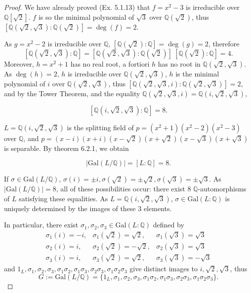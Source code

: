 \documentclass[11pt,a4paper]{article}
\newcommand{\Q}{\mathbb{Q}}
\newcommand{\Gal}{\mathrm{Gal}}
\begin{document}
\begin{proof}
We have already proved (Ex. 5.1.13) that $f= x^2-3$ is irreducible over $\Q[\sqrt{2}]$. $f$ is so the minimal polynomial of $\sqrt{3}$ over $\Q(\sqrt{2})$, thus $[\Q(\sqrt{2},\sqrt{3}):\Q(\sqrt{2})]=\deg(f) = 2$.

As $g = x^2 - 2$ is irreducible over $\Q$, $[\Q(\sqrt{2}):\Q] =\deg(g) =  2$, therefore
$$[\Q(\sqrt{2},\sqrt{3}):\Q] =  [\Q(\sqrt{2},\sqrt{3}):\Q(\sqrt{2})]\ [\Q(\sqrt{2}):\Q] = 4.$$
Moreover, $h = x^2+1$ has no real root, a fortiori $h$ has no root in  $\Q(\sqrt{2},\sqrt{3})$. As $\deg(h)=2$, $h$ is irreducible over $\Q(\sqrt{2},\sqrt{3})$, $h$ is the minimal polynomial of  $i$ over $\Q(\sqrt{2},\sqrt{3})$, thus $[\Q(\sqrt{2},\sqrt{3},i): \Q(\sqrt{2},\sqrt{3})]=2$, and by the Tower Theorem, and the equality $\Q(\sqrt{2},\sqrt{3},i) = \Q(i,\sqrt{2},\sqrt{3})$,

$$[\Q(i,\sqrt{2},\sqrt{3}):\Q] = 8.$$

$L = \Q(i,\sqrt{2},\sqrt{3})$ is the splitting field of $p = (x^2+1)(x^2-2)(x^2-3)$ over $\Q$, and $p =(x-i)(x+i)(x-\sqrt{2})(x+\sqrt{2})(x-\sqrt{3})(x+\sqrt{3})$ is separable. By theorem 6.2.1, we obtain

$$\vert \Gal(L / \Q) \vert = [L:\Q] = 8.$$

If $\sigma \in \Gal(L /\Q)$, $\sigma(i) = \pm i, \sigma(\sqrt{2}) = \pm \sqrt{2}, \sigma(\sqrt{3}) = \pm \sqrt{3}$. As $\vert \Gal(L / \Q) \vert = 8$, all of these  possibilities occur: there exist 8 $\Q$-automorphisms of $L$ satisfying these equalities. As $L = \Q(i,\sqrt{2},\sqrt{3})$, $\sigma \in \Gal(L : \Q)$ is uniquely determined by the images of these 3 elements.

In particular, there exist  $\sigma_1,\sigma_2,\sigma_3 \in \Gal(L : \Q)$ defined by
$$
\begin{array}{lll}
\sigma_1(i) = -i,& \sigma_1(\sqrt{2}) = \sqrt{2},& \sigma_1(\sqrt{3}) = \sqrt{3}\\
\sigma_2(i) = i, &\sigma_2(\sqrt{2}) =- \sqrt{2},& \sigma_2(\sqrt{3}) = \sqrt{3}\\
\sigma_3(i) = i,& \sigma_3(\sqrt{2}) = \sqrt{2}, &\sigma_3(\sqrt{3}) =- \sqrt{3}
\end{array}
$$
and $1_{L}, \sigma_1,\sigma_2,\sigma_3,\sigma_1\sigma_2, \sigma_1\sigma_3,\sigma_2\sigma_3,\sigma_1\sigma_2\sigma_3$ give distinct images to $i,\sqrt{2},\sqrt{3}$, thus
$$G := \Gal(L/\Q) = \{1_{L}, \sigma_1,\sigma_2,\sigma_3,\sigma_1\sigma_2, \sigma_1\sigma_3,\sigma_2\sigma_3,\sigma_1\sigma_2\sigma_3\}.$$


\end{proof}
\end{document}
